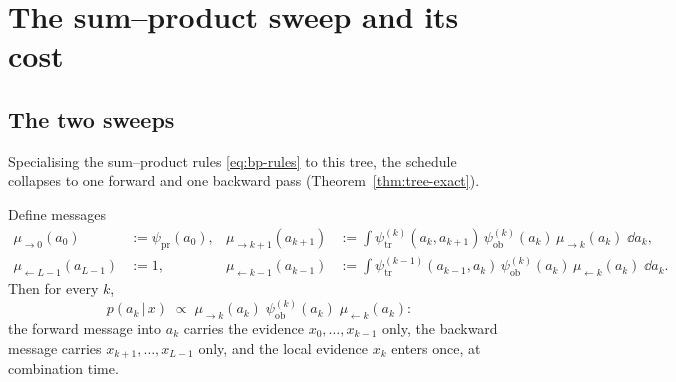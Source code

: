 \section{The sum--product sweep and its cost}
\label{sec:bp-sweep}

\subsection{The two sweeps}

Specialising the sum--product rules \eqref{eq:bp-rules} to this tree, the
schedule collapses to one forward and one backward pass
(Theorem~\ref{thm:tree-exact}).

\begin{proposition}\label{prop:bp-convA}
Define messages
\begin{align}
  \mu_{\to 0}(a_0) &:= \psi_{\mathrm{pr}}(a_0),
  &
  \mu_{\to k+1}(a_{k+1}) &:= \int
    \psi^{(k)}_{\mathrm{tr}}(a_k, a_{k+1})\,
    \psi^{(k)}_{\mathrm{ob}}(a_k)\,
    \mu_{\to k}(a_k)\; \dd a_k ,
  \label{eq:bp-fwd}\\
  \mu_{\leftarrow L-1}(a_{L-1}) &:= 1,
  &
  \mu_{\leftarrow k-1}(a_{k-1}) &:= \int
    \psi^{(k-1)}_{\mathrm{tr}}(a_{k-1}, a_k)\,
    \psi^{(k)}_{\mathrm{ob}}(a_k)\,
    \mu_{\leftarrow k}(a_k)\; \dd a_k .
  \label{eq:bp-bwd}
\end{align}
Then for every $k$,
\begin{equation}
  p(a_k \,|\, x) \;\propto\;
  \mu_{\to k}(a_k)\;
  \psi^{(k)}_{\mathrm{ob}}(a_k)\;
  \mu_{\leftarrow k}(a_k) :
  \label{eq:bp-combine}
\end{equation}
the forward message into $a_k$ carries the evidence
$x_0, \dots, x_{k-1}$ only, the backward message carries
$x_{k+1}, \dots, x_{L-1}$ only, and the local evidence $x_k$ enters once,
at combination time.
\end{proposition}


